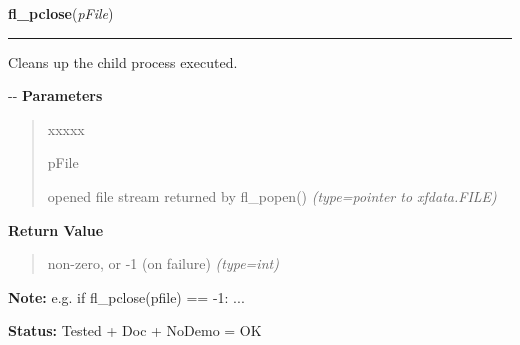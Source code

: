     \vspace{0.5ex}

\hspace{.8\funcindent}\begin{boxedminipage}{\funcwidth}

    \raggedright \textbf{fl\_pclose}(\textit{pFile})

    \vspace{-1.5ex}

    \rule{\textwidth}{0.5\fboxrule}
\setlength{\parskip}{2ex}

Cleans up the child process executed.

-{}-
\setlength{\parskip}{1ex}
      \textbf{Parameters}
      \vspace{-1ex}

      \begin{quote}
        \begin{Ventry}{xxxxx}

          \item[pFile]


opened file stream returned by fl\_popen()
            {\it (type=pointer to xfdata.FILE)}

        \end{Ventry}

      \end{quote}

      \textbf{Return Value}
    \vspace{-1ex}

      \begin{quote}

non-zero, or -1 (on failure)
      {\it (type=int)}

      \end{quote}

\textbf{Note:} 
e.g. if fl\_pclose(pfile) == -1: ...


\textbf{Status:} 
Tested + Doc + NoDemo = OK


    \end{boxedminipage}

    \label{xformslib:flgoodies:fl_end_all_command}

    \vspace{0.5ex}

